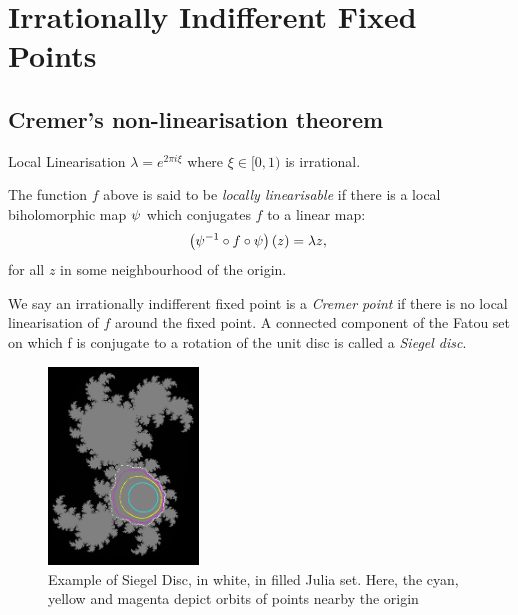\section{Irrationally Indifferent Fixed Points}
\sectiontitleframe

\subsection{Cremer's non-linearisation theorem}
\begin{frame}{Local Linearisation}
$\lambda = e^{2\pi i \xi}$ where $\xi \in [0,1)$ is irrational.
    \begin{dfn} The function $f$ above is said to be \emph{locally linearisable} if there is a local biholomorphic map $\psi$ which conjugates $f$ to a linear map:
\begin{equation}\label{eq: Schroder}
    \left(\psi^{-1} \circ f \circ \psi\right)(z) = \lambda z, \;
\end{equation}
for all $z$ in some neighbourhood of the origin.
\end{dfn}
\end{frame}

\begin{frame}
  We say an irrationally indifferent fixed point is a \textit{Cremer point} if there is no local linearisation of $f$ around the fixed point. A connected component of the Fatou set on which f is conjugate to a rotation of the unit disc is called a \emph{Siegel disc}.
 \begin{figure}
    \label{8:fig:Siegel Disc}
    \centering
    \includegraphics[width=4cm]{resources/ch-11/Picture1.png}
    \caption{Example of Siegel Disc, in white, in filled Julia set. Here, the cyan, yellow and magenta depict orbits of points nearby the origin} %
    
\end{figure}
\end{frame}

